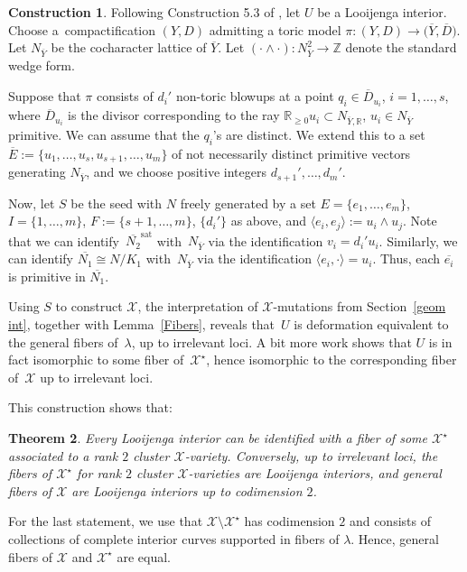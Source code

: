 \documentclass[10pt,a4paper]{amsart}
\numberwithin{equation}{section}
\numberwithin{figure}{section}
\numberwithin{table}{section}
\DeclareMathOperator{\sat}{sat}
\let\?=\overline
\let\bb=\mathbb
\let\rar=\rightarrow
\let\s=\mathcal
\newtheorem{thm}{Theorem}[section]
\theoremstyle{definition}
\newtheorem{constr}[thm]{Construction}
\begin{document}
\begin{constr}\label{LooijengaConstr}Following Construction 5.3 of \cite{GHK3}, let $U$ be a Looijenga interior. Choose a~compactification $(Y,D)$ admitting a toric model $\pi\colon (Y,D)\rar \big(\?{Y},\?{D}\big)$. Let $N_{\?{Y}}$ be the cocha\-rac\-ter lattice of $\?{Y}$. Let $(\cdot \wedge \cdot)\colon N_{\?{Y}}^2\rar \bb{Z}$ denote the standard wedge form.

Suppose that $\pi$ consists of $d_i'$ non-toric blowups at a point $q_i\in \?{D}_{u_i}$, $i=1,\dots,s$, where $\?{D}_{u_i}$ is the divisor corresponding to the ray $\bb{R}_{\geq 0} u_i \subset N_{\?{Y},\bb{R}}$, $u_i\in N_{\?{Y}}$ primitive.
 We can assume that the $q_i$'s are distinct. We extend this to a set $\?{E}:=\{u_1,\dots,u_s,u_{s+1},\dots,u_m\}$ of not necessarily distinct primitive vectors generating $N_{\?{Y}}$, and we choose positive integers $d_{s+1}',\dots,d_m'$.

Now, let $S$ be the seed with $N$ freely generated by a set $E=\{e_1,\dots,e_m\}$, $I=\{1,\dots,m\}$, $F:=\{s+1,\dots,m\}$, $\{d_i'\}$ as above, and $\langle e_i,e_j \rangle := u_i \wedge u_j$.
 Note that we can identify~$\?{N_2}^{\sat}$ with~$N_{\?{Y}}$ via the identification $v_i=d_i'u_i$. Similarly, we can identify $\?{N_1}\cong N/K_1$ with~$N_{\?{Y}}$ via the identification $\langle e_i,\cdot\rangle = u_i$. Thus, each $\?{e_i}$ is primitive in $\?{N_1}$.

 Using $S$ to construct $\s{X}$, the interpretation of $\s{X}$-mutations from Section~\ref{geom int}, together with Lemma~\ref{Fibers}, reveals that~$U$ is deformation equivalent to the general fibers of~$\lambda$, up to irrelevant loci. A bit more work shows that $U$ is in fact isomorphic to some fiber of~$\s{X}^{\star}$, hence isomorphic to the corresponding fiber of~$\s{X}$ up to irrelevant loci.
\end{constr}

This construction shows that:

\begin{thm}\label{Looijenga}Every Looijenga interior can be identified with a fiber of some $\s{X}^{\star}$ associated to a rank $2$ cluster $\s{X}$-variety. Conversely, up to irrelevant loci, the fibers of $\s{X}^{\star}$ for rank $2$ cluster $\s{X}$-varieties are Looijenga interiors, and general fibers of $\s{X}$ are Looijenga interiors up to codimension $2$.
 \end{thm}
For the last statement, we use that $\s{X}\setminus \s{X}^{\star}$ has codimension $2$ and consists of collections of complete interior curves supported in fibers of $\lambda$. Hence, general fibers of $\s{X}$ and $\s{X}^{\star}$ are equal.
\end{document}

